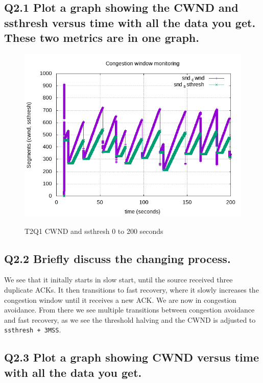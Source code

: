 \documentclass{article}
\begin{document}
\subsection{Q2.1 Plot a graph showing the CWND and ssthresh versus time with all the data you get. These two metrics are in one graph.}\label{sec:q21}

\begin{figure}[H]
	\includegraphics{lab1-group1-task2-question1.png}
	\label{fig:q21}
	\caption{T2Q1 CWND and ssthresh 0 to 200 seconds}
\end{figure}


\subsection{Q2.2 Briefly discuss the changing process.}

We see that it initally starts in slow start, until the source received three
duplicate ACKs. It then transitions to fast recovery, where it slowly increases
the congestion window until it receives a new ACK. We are now in congestion
avoidance. From there we see multiple transitions between congestion avoidance
and fast recovery, as we see the threshold halving and the CWND is adjusted to
\texttt{ssthresh + 3MSS}.


\subsection{Q2.3 Plot a graph showing CWND versus time with all the data you get.}
\end{document}
